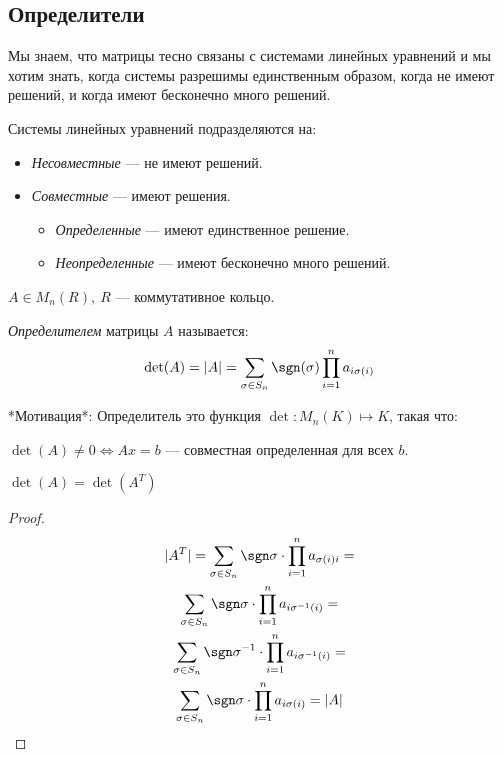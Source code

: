 \subsection{Определители}

Мы знаем, что матрицы тесно связаны с системами линейных уравнений и мы хотим знать, когда системы разрешимы единственным образом, когда не имеют решений, и когда имеют бесконечно много решений.

\begin{defn}
    Системы линейных уравнений подразделяются на:

    \begin{itemize}
        \item \emph{Несовместные} --- не имеют решений.
        \item \emph{Совместные} --- имеют решения.
        \begin{itemize}
            \item \emph{Определенные} --- имеют единственное решение.
            \item \emph{Неопределенные} --- имеют бесконечно много решений.
        \end{itemize}
    \end{itemize}
\end{defn}

\begin{defn}
    $A \in M_n(R),~ R$ --- коммутативное кольцо. 
    
    \emph{Определителем} матрицы $A$ называется: 
    $$\det(A) = |A| = \sum\limits_{\sigma \in S_n} \sgn(\sigma)\prod\limits_{i = 1}^n a_{i\sigma(i)}$$
\end{defn}


\begin{notice}
    *Мотивация*: Определитель это функция $\det: M_{n}(K) \mapsto K$, такая что:

    $\det(A) \neq 0 \iff Ax = b$ --- совместная определенная для всех $b$.
\end{notice}

\begin{theorem-non}
    $\det(A) = \det(A^T)$
\end{theorem-non}

\begin{proof}
    \begin{gather*}
        |A^T| = \sum\limits_{\sigma \in S_n} \sgn \sigma \cdot \prod\limits_{i = 1}^n a_{\sigma(i)i} = \\
        \sum\limits_{\sigma \in S_n} \sgn \sigma \cdot \prod\limits_{i = 1}^n a_{i\sigma^{-1}(i)} = \\
        \sum\limits_{\sigma \in S_n} \sgn \sigma^{-1} \cdot \prod\limits_{i = 1}^n a_{i\sigma^{-1}(i)} = \\
        \sum\limits_{\sigma \in S_n} \sgn \sigma \cdot \prod\limits_{i = 1}^n a_{i\sigma(i)} = |A|
    \end{gather*}
\end{proof}